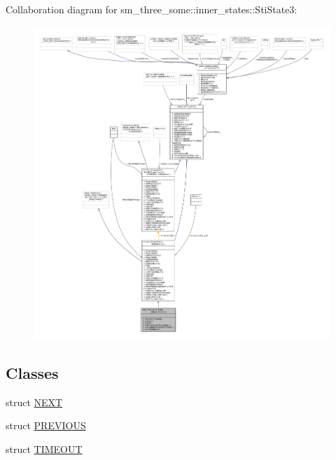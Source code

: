 Collaboration diagram for sm\+\_\+three\+\_\+some\+:\+:inner\+\_\+states\+:\+:Sti\+State3\+:
\nopagebreak
\begin{figure}[H]
\begin{center}
\leavevmode
\includegraphics[width=350pt]{structsm__three__some_1_1inner__states_1_1StiState3__coll__graph}
\end{center}
\end{figure}
\subsection*{Classes}
\begin{DoxyCompactItemize}
\item 
struct \hyperlink{structsm__three__some_1_1inner__states_1_1StiState3_1_1NEXT}{N\+E\+XT}
\item 
struct \hyperlink{structsm__three__some_1_1inner__states_1_1StiState3_1_1PREVIOUS}{P\+R\+E\+V\+I\+O\+US}
\item 
struct \hyperlink{structsm__three__some_1_1inner__states_1_1StiState3_1_1TIMEOUT}{T\+I\+M\+E\+O\+UT}
\end{DoxyCompactItemize}
